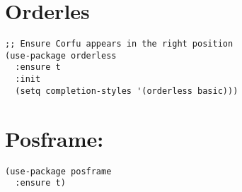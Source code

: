 \documentclass[11pt]{article}
\begin{document}
\section{Orderles}
\label{sec:org171644b}
\begin{verbatim}
;; Ensure Corfu appears in the right position
(use-package orderless
  :ensure t
  :init
  (setq completion-styles '(orderless basic)))
\end{verbatim}
\section{Posframe:}
\label{sec:org0570f6d}
\begin{verbatim}
(use-package posframe
  :ensure t)
\end{verbatim}
\end{document}
